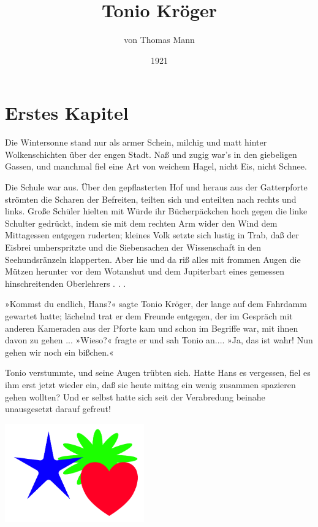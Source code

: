 \documentclass[twoside,DIV=calc,BCOR=5mm,12pt,ngerman,twocolumn]{scrartcl}
\title{Tonio Kröger}
\author{von Thomas Mann}
\date{1921}
\begin{document}
\maketitle

\section{Erstes Kapitel}
Die Wintersonne stand nur als armer Schein, milchig und matt hinter
Wolkenschichten über der engen Stadt. Naß und zugig war's in den
giebeligen Gassen, und manchmal fiel eine Art von weichem Hagel, nicht
Eis, nicht Schnee.

Die Schule war aus. Über den gepflasterten Hof und heraus aus der
Gatterpforte strömten die Scharen der Befreiten, teilten sich und
enteilten nach rechts und links. Große Schüler hielten mit Würde ihr
Bücherpäckchen hoch gegen die linke Schulter gedrückt, indem sie mit dem
rechten Arm wider den Wind dem Mittagessen entgegen ruderten; kleines
Volk setzte sich lustig in Trab, daß der Eisbrei umherspritzte und die
Siebensachen der Wissenschaft in den Seehundsränzeln klapperten. Aber
hie und da riß alles mit frommen Augen die Mützen herunter vor dem
Wotanshut und dem Jupiterbart eines gemessen hinschreitenden
Oberlehrers . . .

»Kommst du endlich, Hans?« sagte Tonio Kröger, der lange auf dem
Fahrdamm gewartet hatte; lächelnd trat er dem Freunde entgegen, der im
Gespräch mit anderen Kameraden aus der Pforte kam und schon im Begriffe
war, mit ihnen davon zu gehen ... »Wieso?« fragte er und sah Tonio
an.... »Ja, das ist wahr! Nun gehen wir noch ein bißchen.«

Tonio verstummte, und seine Augen trübten sich. Hatte Hans es vergessen,
fiel es ihm erst jetzt wieder ein, daß sie heute mittag ein wenig
zusammen spazieren gehen wollten? Und er selbst hatte sich seit der
Verabredung beinahe unausgesetzt darauf gefreut!

\begin{center}
    \includegraphics[width=6cm]{HerzStern.pdf}    
\end{center}
\end{document}
